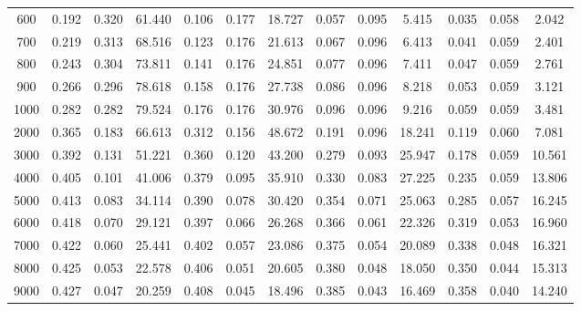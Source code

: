 \documentclass[11pt]{article}
\begin{document}
\begin{table}[htbp]
\begin{tabular}{ccccccccccccc}
		600    & 0.192      & 0.320      & 61.440      & 0.106       & 0.177      & 18.727      & 0.057      & 0.095      & 5.415      & 0.035     & 0.058     & 2.042      \\
		700    & 0.219      & 0.313      & 68.516      & 0.123       & 0.176      & 21.613      & 0.067      & 0.096      & 6.413      & 0.041     & 0.059     & 2.401      \\
		800    & 0.243      & 0.304      & 73.811      & 0.141       & 0.176      & 24.851      & 0.077      & 0.096      & 7.411      & 0.047     & 0.059     & 2.761      \\
		900    & 0.266      & 0.296      & 78.618      & 0.158       & 0.176      & 27.738      & 0.086      & 0.096      & 8.218      & 0.053     & 0.059     & 3.121      \\ \midrule
		1000   & 0.282      & 0.282      & 79.524      & 0.176       & 0.176      & 30.976      & 0.096      & 0.096      & 9.216      & 0.059     & 0.059     & 3.481      \\
		2000   & 0.365      & 0.183      & 66.613      & 0.312       & 0.156      & 48.672      & 0.191      & 0.096      & 18.241     & 0.119     & 0.060     & 7.081      \\
		3000   & 0.392      & 0.131      & 51.221      & 0.360       & 0.120      & 43.200      & 0.279      & 0.093      & 25.947     & 0.178     & 0.059     & 10.561     \\
		4000   & 0.405      & 0.101      & 41.006      & 0.379       & 0.095      & 35.910      & 0.330      & 0.083      & 27.225     & 0.235     & 0.059     & 13.806     \\
		5000   & 0.413      & 0.083      & 34.114      & 0.390       & 0.078      & 30.420      & 0.354      & 0.071      & 25.063     & 0.285     & 0.057     & 16.245     \\
		6000   & 0.418      & 0.070      & 29.121      & 0.397       & 0.066      & 26.268      & 0.366      & 0.061      & 22.326     & 0.319     & 0.053     & 16.960     \\
		7000   & 0.422      & 0.060      & 25.441      & 0.402       & 0.057      & 23.086      & 0.375      & 0.054      & 20.089     & 0.338     & 0.048     & 16.321     \\
		8000   & 0.425      & 0.053      & 22.578      & 0.406       & 0.051      & 20.605      & 0.380      & 0.048      & 18.050     & 0.350     & 0.044     & 15.313     \\
		9000   & 0.427      & 0.047      & 20.259      & 0.408       & 0.045      & 18.496      & 0.385      & 0.043      & 16.469     & 0.358     & 0.040     & 14.240     \\ \midrule

\end{tabular}
\end{table}
\end{document}
